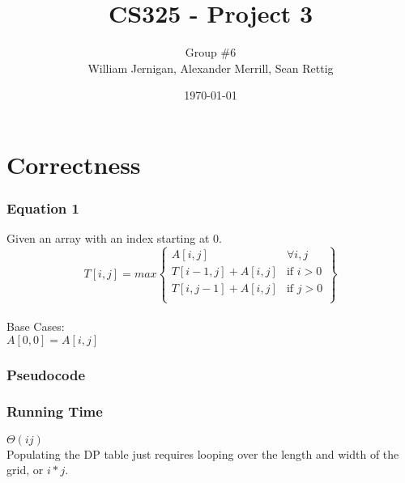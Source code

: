 \documentclass{article}
\title{CS325 - Project 3}
\author{Group \#6 \\ William Jernigan, Alexander Merrill, Sean Rettig}
\date{\today}
\begin{document}
\maketitle

\part*{Correctness}
\section*{Equation 1}
Given an array with an index starting at 0.\\

\[ T[i,j] = max \left\{ \begin{array}{ll}
    A[i,j] & \mbox{$\forall i, j$}\\
    T[i-1,j] + A[i,j] & \mbox{if $i > 0$}\\
    T[i,j-1] + A[i,j] & \mbox{if $j > 0$}\\\end{array} \right\} \] \\
Base Cases:\\
$A[0,0] = A[i,j]$\\


\section*{Pseudocode}


\section*{Running Time}
$\Theta(ij)$\\
Populating the DP table just requires looping over the length and width of the grid, or $i * j$.
\end{document}
